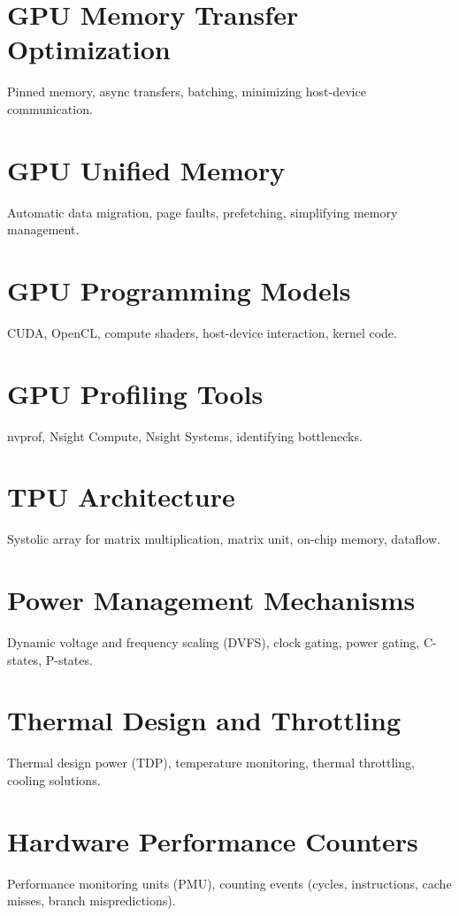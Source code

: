 \chapter{GPU Memory Transfer Optimization}
Pinned memory, async transfers, batching, minimizing host-device communication.

\chapter{GPU Unified Memory}
Automatic data migration, page faults, prefetching, simplifying memory management.

\chapter{GPU Programming Models}
CUDA, OpenCL, compute shaders, host-device interaction, kernel code.

\chapter{GPU Profiling Tools}
nvprof, Nsight Compute, Nsight Systems, identifying bottlenecks.

\chapter{TPU Architecture}
Systolic array for matrix multiplication, matrix unit, on-chip memory, dataflow.


\chapter{Power Management Mechanisms}
Dynamic voltage and frequency scaling (DVFS), clock gating, power gating, C-states, P-states.

\chapter{Thermal Design and Throttling}
Thermal design power (TDP), temperature monitoring, thermal throttling, cooling solutions.

\chapter{Hardware Performance Counters}
Performance monitoring units (PMU), counting events (cycles, instructions, cache misses, branch mispredictions).

